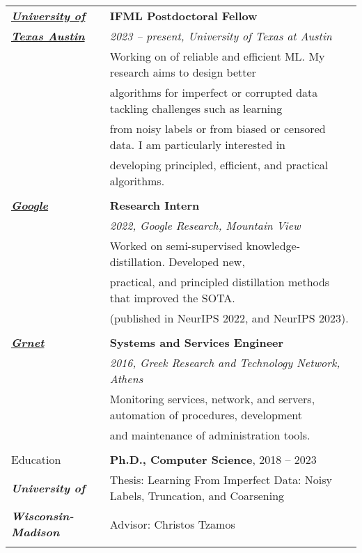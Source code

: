 \documentclass[letterpaper,11pt,oneside]{article}
\begin{document}
\noindent \begin{longtable}{@{} l l}

\href{https://www.ifml.institute}{\emph{\textbf{University of}}} 
  & \textbf{IFML Postdoctoral Fellow} \\

\href{https://www.ifml.institute}
{\textbf{\emph{Texas Austin}}}  & \emph{2023 -- present, University of Texas at Austin} \\
& Working on of reliable and efficient ML.
 My research aims to design better \\
& algorithms for imperfect or corrupted data tackling challenges such
 as learning \\
 & from noisy labels or from biased or censored data. I am particularly interested in \\
 & developing principled, efficient, and practical algorithms. \\
  & \\

\href{https://research.google}{\emph{\textbf{Google}}}
  &\textbf{Research Intern} \\
  & \emph{2022, Google Research, Mountain View}\\
  & Worked on semi-supervised knowledge-distillation.  
Developed new, \\
  & practical, and principled distillation methods that improved the SOTA. \\
  & (published in NeurIPS 2022, and NeurIPS 2023).\\
  & \\

  \href{https://grnet.gr/}{\emph{\textbf{Grnet}}}
  &\textbf{Systems and Services Engineer} \\
  & \emph{2016, Greek Research and Technology Network, Athens}\\
  & Monitoring services, network, and servers, automation of procedures, development \\ 
  & and maintenance of administration tools. \\
  &\\

 \Large{Education}

     & \textbf{Ph.D., Computer Science}, 2018 -- 2023 \\
      \emph{\textbf{University of}}
     & Thesis: Learning From Imperfect Data: 
      Noisy Labels, Truncation, and Coarsening \\
      \emph{\textbf{Wisconsin-Madison} }
     & Advisor: Christos Tzamos\\
     & \\


\end{longtable}
\end{document}
